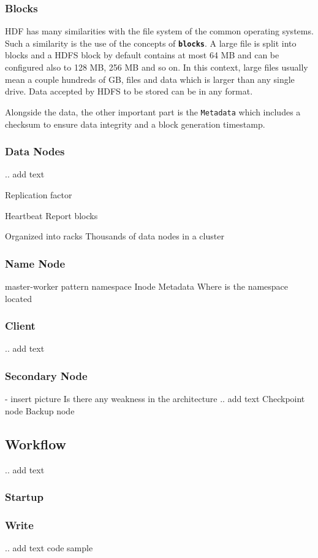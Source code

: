 \documentclass{sig-alternate}
\begin{document}
\subsubsection{Blocks}
HDF has many similarities with the file system of the common operating systems. Such a similarity is the use of the concepts of \textbf{\texttt{blocks}}.
A large file is split into blocks and a HDFS block by default contains at most 64 MB and can be configured also to 128 MB, 256 MB and so on.
In this context, large files usually mean a couple hundreds of GB, files and data which is larger than any single drive.
Data accepted by HDFS to be stored can be in any format.

Alongside the data, the other important part is the \texttt{Metadata} which includes a checksum to ensure data integrity and a block generation timestamp.

\subsubsection{Data Nodes}
.. add text

Replication factor

Heartbeat
Report blocks

Organized into racks
Thousands of data nodes in a cluster

\subsubsection{Name Node}
master-worker pattern
namespace
Inode
Metadata
Where is the namespace located

\subsubsection{Client}
.. add text
\subsubsection{Secondary Node}
- insert picture
Is there any weakness in the architecture
.. add text
Checkpoint node
Backup node

\subsection{Workflow}
.. add text
\subsubsection{Startup}
\subsubsection{Write}
.. add text code sample
\end{document}
